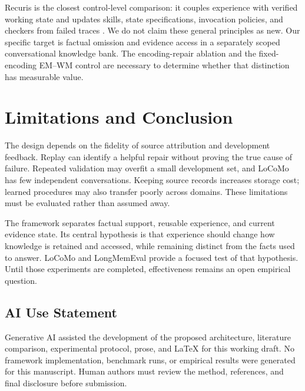 \documentclass{article}
\begin{document}
Recuris is the closest control-level comparison: it couples experience with
verified working state and updates skills, state specifications, invocation
policies, and checkers from failed traces \citep{recuris}. We do not claim
these general principles as new. Our specific target is factual omission and
evidence access in a separately scoped conversational knowledge bank. The
encoding-repair ablation and the fixed-encoding EM--WM control are necessary
to determine whether that distinction has measurable value.

\section{Limitations and Conclusion}
The design depends on the fidelity of source attribution and development
feedback. Replay can identify a helpful repair without proving the true cause
of failure. Repeated validation may overfit a small development set, and
LoCoMo has few independent conversations. Keeping source records increases
storage cost; learned procedures may also transfer poorly across domains.
These limitations must be evaluated rather than assumed away.

The framework separates factual support, reusable experience, and current
evidence state. Its central hypothesis is that experience should change how
knowledge is retained and accessed, while remaining distinct from the facts
used to answer. LoCoMo and LongMemEval provide a focused test of that
hypothesis. Until those experiments are completed, effectiveness remains an
open empirical question.

\subsection*{AI Use Statement}
Generative AI assisted the development of the proposed architecture, literature
comparison, experimental protocol, prose, and LaTeX for this working draft.
No framework implementation, benchmark runs, or empirical results were
generated for this manuscript. Human authors must review the method,
references, and final disclosure before submission.

\clearpage


\end{document}
